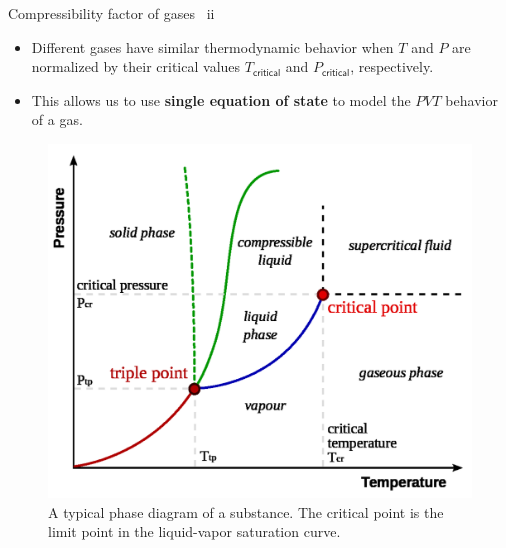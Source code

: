 \begin{frame}{Compressibility factor of gases \, ii}

\begin{itemize}
\item Different gases have similar thermodynamic behavior when
$T$ and $P$ are normalized by their critical values $T_{\mathsf{critical}}$ and $P_{\mathsf{critical}}$, respectively.
\item This allows us to use \textbf{single equation of state} to model the $PVT$ behavior of a gas.
\end{itemize}
%
\begin{figure}
\centering
\includegraphics[height=0.6\textheight]{figures/activity-models/phase-diagram-pt}
\caption{{\footnotesize{}A typical phase diagram of a substance. The critical
point is the limit point in the liquid-vapor saturation curve.}}
\end{figure}



\end{frame}
